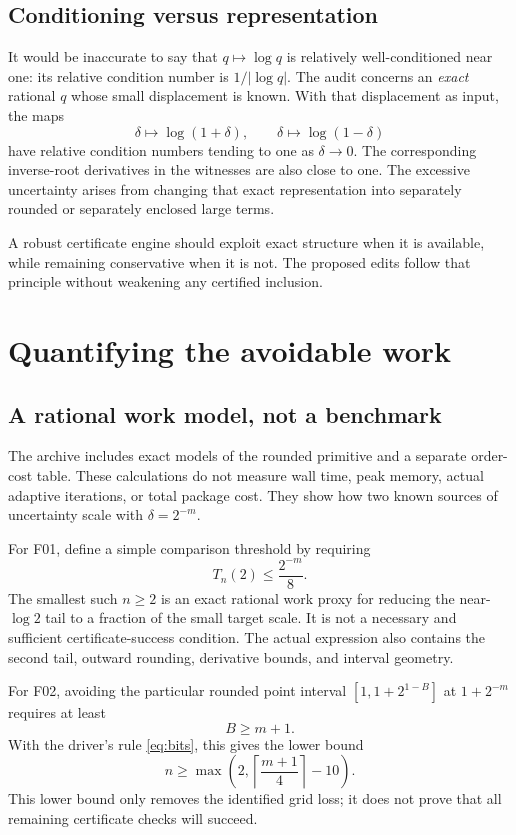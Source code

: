 \documentclass[11pt,letterpaper]{article}
\theoremstyle{remark}\newtheorem{remark}[proposition]{Remark}
\begin{document}
\subsection{Conditioning versus representation}
It would be inaccurate to say that $q\mapsto\log q$ is relatively
well-conditioned near one: its relative condition number is
$1/|\log q|$. The audit concerns an \emph{exact} rational $q$ whose small
displacement is known. With that displacement as input, the maps
\[
 \delta\mapsto\log(1+\delta),\qquad
 \delta\mapsto\log(1-\delta)
\]
have relative condition numbers tending to one as $\delta\to0$.
The corresponding inverse-root derivatives in the witnesses are also close
to one. The excessive uncertainty arises from changing that exact
representation into separately rounded or separately enclosed large terms.

A robust certificate engine should exploit exact structure when it is
available, while remaining conservative when it is not. The proposed edits
follow that principle without weakening any certified inclusion.

\section{Quantifying the avoidable work}
\subsection{A rational work model, not a benchmark}
The archive includes exact models of the rounded primitive and a separate
order-cost table. These calculations do not measure wall time, peak memory,
actual adaptive iterations, or total package cost. They show how two known
sources of uncertainty scale with $\delta=2^{-m}$.

For F01, define a simple comparison threshold by requiring
\begin{equation}\label{eq:proxy}
 T_n(2)\le\frac{2^{-m}}8.
\end{equation}
The smallest such $n\ge2$ is an exact rational work proxy for reducing the
near-$\log2$ tail to a fraction of the small target scale. It is not a
necessary and sufficient certificate-success condition. The actual
expression also contains the second tail, outward rounding, derivative
bounds, and interval geometry.

For F02, avoiding the particular rounded point interval
$[1,1+2^{1-B}]$ at $1+2^{-m}$ requires at least
\[
 B\ge m+1.
\]
With the driver's rule \eqref{eq:bits}, this gives the lower bound
\begin{equation}\label{eq:affineorder}
 n\ge \max\left(2,\left\lceil\frac{m+1}{4}\right\rceil-10\right).
\end{equation}
This lower bound only removes the identified grid loss; it does not prove
that all remaining certificate checks will succeed.
\end{document}
